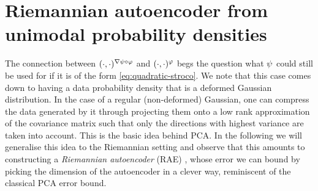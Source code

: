     \section{Riemannian autoencoder from unimodal probability densities}
    \label{sec:rae}
    
    The connection between $(\cdot,\cdot)^{\nabla \psi \circ \varphi}$ and $(\cdot,\cdot)^{\varphi}$ begs the question what $\psi$ could still be used for if it is of the form \ref{eq:quadratic-stroco}. 
    We note that this case comes down to having a data probability density that is a deformed Gaussian distribution. In the case of a regular (non-deformed) Gaussian, one can compress the data generated by it through projecting them onto a low rank approximation of the covariance matrix such that only the directions with highest variance are taken into account. This is the basic idea behind PCA. In the following we will generalise this idea to the Riemannian setting and observe that this amounts to constructing a \emph{Riemannian autoencoder} (RAE) \cite{diepeveen2024pulling}, whose error we can bound by picking the dimension of the autoencoder in a clever way, reminiscent of the classical PCA error bound.

